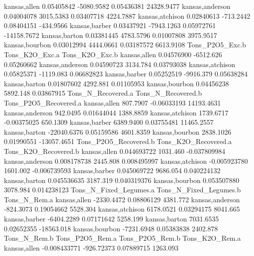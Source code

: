 \documentclass{report}
\begin{document}
\begin{Schunk}
\begin{Soutput}
kansas,allen      0.05405842   -5080.9582   0.05436381      24328.9477
kansas,anderson   0.04004078    3015.5383   0.03407718       4224.7887
kansas,atchison   0.02840613    -713.2442   0.08404151       -434.9566
kansas,barber     0.03437921   -7943.1263   0.05972761     -14158.7672
kansas,barton     0.03381445    4783.5796   0.01007808       3975.9517
kansas,bourbon    0.03012994    4444.0661   0.03187572       6613.9108
                Tons_P2O5_Exc.b Tons_K2O_Exc.a Tons_K2O_Exc.b
kansas,allen         0.04576900      -6512.626     0.05260662
kansas,anderson      0.04590723       3134.784     0.03793038
kansas,atchison      0.05825371      -1119.083     0.06682823
kansas,barber        0.05252519      -9916.379     0.05638284
kansas,barton        0.01807602       4292.881     0.01105953
kansas,bourbon       0.04456238       5892.148     0.03867915
                Tons_N_Recovered.a Tons_N_Recovered.b Tons_P2O5_Recovered.a
kansas,allen              807.7907        -0.06033193            14193.4631
kansas,anderson           942.0495         0.01644044             1388.8859
kansas,atchison          1739.6717        -0.00375025              650.1309
kansas,barber            6389.9400         0.03755481            11465.2557
kansas,barton          -22040.6376         0.05159586             4601.8359
kansas,bourbon           2838.1026         0.01990551           -13057.4651
                Tons_P2O5_Recovered.b Tons_K2O_Recovered.a Tons_K2O_Recovered.b
kansas,allen              0.044693722             1031.460         -0.037809984
kansas,anderson           0.008178738             2445.808          0.008495997
kansas,atchison          -0.005923780             1601.002         -0.006739593
kansas,barber             0.045069722             9686.054          0.040224132
kansas,barton             0.045536635             3187.319          0.040319376
kansas,bourbon            0.053507880             3078.984          0.014238123
                Tons_N_Fixed_Legumes.a Tons_N_Fixed_Legumes.b Tons_N_Rem.a
kansas,allen                -2330.4472             0.08806129     4381.772
kansas,anderson              -824.3073             0.19054662     5528.304
kansas,atchison              6178.0521             0.03294175     8041.665
kansas,barber               -6404.2289             0.07171642     5258.199
kansas,barton                7031.6535             0.02652355   -18563.018
kansas,bourbon              -7231.6948             0.05383838     2402.878
                Tons_N_Rem.b Tons_P2O5_Rem.a Tons_P2O5_Rem.b Tons_K2O_Rem.a
kansas,allen    -0.008433771      -926.72373      0.07889715       1263.093

\end{Soutput}
\end{Schunk}
\end{document}

